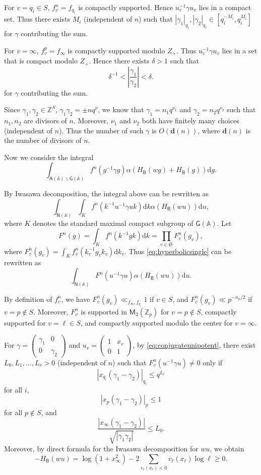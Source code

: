 \documentclass[10pt,oneside,reqno]{amsart}
\makeatletter
\newcommand\rmd{\mathrm{d}}
\renewcommand\AA{\mathbb{A}}
\newcommand\ZZ{\mathbb{Z}}
\newcommand\mf[1]{\mathfrak{#1}}
\newcommand\A{\mathsf{A}}
\newcommand\B{\mathsf{B}}
\newcommand\G{\mathsf{G}}
\newcommand\M{\mathsf{M}}
\newcommand\N{\mathsf{N}}
\newcommand\bs{\backslash}
\renewcommand\leq{\leqslant}
\renewcommand\geq{\geqslant}
\theoremstyle{THEOREM}
\theoremstyle{DEFINITION}
\theoremstyle{EXERCISE}
\numberwithin{equation}{section}
\renewenvironment{proof}[1][\proofname]{\par
  \vspace{-6pt}
  \pushQED{\qed}
  \normalfont \topsep6\p@\@plus6\p@\relax
  \trivlist
  \item[\hskip\labelsep\rmfamily\bfseries
    #1\@addpunct{:}]\ignorespaces
}{
  \popQED\endtrivlist\@endpefalse
  \vspace{-6pt}
}
\makeatother
\begin{document}
\begin{proof}
For $v=q_i\in S$, $f_v^n=f_{q_i}$ is compactly supported. Hence $u_v^{-1}\gamma u_v$ lies in a compact set. Thus there exists $M_i$ (independent of $n$) such that $|\gamma_1|_{q_i},|\gamma_2|_{q_i}\in [q_i^{-M_i},q_i^{M_i}]$ for $\gamma$ contributing the sum. 

For $v=\infty$, $f_v^p=f_\infty$ is compactly supported modulo $Z_+$. Thus $u_v^{-1}\gamma u_v$ lies in a set that is compact modulo $Z_+$. Hence there exists $\delta>1$ such that 
\[
\delta^{-1}<\left|\frac{\gamma_1}{\gamma_2}\right|<\delta.
\]
for $\gamma$ contributing the sum.

Since $\gamma_1,\gamma_2\in \ZZ^S$, $\gamma_1\gamma_2=\pm nq^\nu$, we know that $\gamma_1=n_1q^{\nu_1}$ and $\gamma_2=n_2q^{\nu_2}$ such that $n_1,n_2$ are divisors of $n$. Moreover, $\nu_1$ and $\nu_2$ both have finitely many choices (independent of $n$). Thus the number of such $\gamma$ is $O(\bm{d}(n))$, where $\bm{d}(n)$ is the number of divisors of $n$.

Now we consider the integral
\begin{equation}\label{eq:hyperbolicsingle}
\int_{\A(\AA)\bs \G(\AA)}f^n(g^{-1}\gamma g)\alpha(H_\B(wg)+H_\B(g))\rmd g.
\end{equation}

By Iwasawa decomposition, the integral above can be rewritten as
\[
\int_{\N(\AA)}\int_{K}f^n(k^{-1}u^{-1}\gamma uk)\rmd k \alpha(H_\B(wu))\rmd u,
\]
where $K$ denotes the standard maximal compact subgroup of $\G(\AA)$. Let
\[
F^n(g)=\int_{K}f^n(k^{-1}gk)\rmd k=\prod_{v\in \mf{S}}F_v^n(g_v),
\]
where $F_v^n(g_v)=\int_{K}f_v^n(k_v^{-1}g_vk_v)\rmd k_v$. Thus \eqref{eq:hyperbolicsingle} can be rewritten as
\begin{equation}\label{eq:hyperbolicsingle2}
\int_{\N(\AA)}F^n(u^{-1}\gamma u)\alpha(H_\B(wu))\rmd u.
\end{equation}

By definition of $f_v^n$, we have $F_v^n(g_v)\ll_{f_\infty,f_{q_i}} 1$ if $v\in S$, and $F_v^n(g_v)\ll p^{-n_p/2}$ if $v=p\notin S$. Moreover, $F_v^n$ is supported in $\M_2(\ZZ_p)$ for $v=p\notin S$, compactly supported for $v=\ell\in S$, and compactly supported modulo the center for $v=\infty$. 

For $\gamma=(\begin{smallmatrix} \gamma_1 & 0 \\ 0 & \gamma_2 \end{smallmatrix})$ and $u_v=(\begin{smallmatrix} 1 & x_v \\ 0 & 1 \end{smallmatrix})$, by \eqref{eq:conjugateunipotent}, there exist $L_0,L_1,\dots,L_r>0$ (independent of $n$) such that $F^n_v(u^{-1}\gamma u)\neq 0$ only if 
\[
|x_{q_i}(\gamma_1-\gamma_2)|_{q_i}\leq q^{L_i}
\]
for all $i$,
\[
|x_p(\gamma_1-\gamma_2)|_p\leq 1
\]
for all $p\notin S$, and
\[
\frac{|x_\infty(\gamma_1-\gamma_2)|}{\sqrt{|\gamma_1\gamma_2|}}\leq L_0.
\]
Moreover, by direct formula for the Iwasawa decomposition for $wu$, we obtain
\[
-H_\B(wu)=\log(1+x_\infty^2)-2\sum_{v_\ell(x_\ell)<0}v_\ell(x_\ell)\log\ell\geq 0.
\]


\end{proof}
\end{document}
